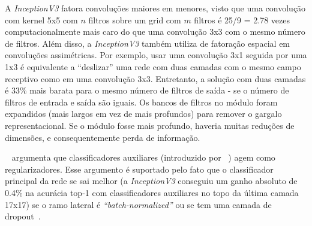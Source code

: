 \documentclass{bmvc2k}
\begin{document}
A \textit{InceptionV3} fatora convoluções maiores em menores, visto que uma convolução com kernel 5x5 com $n$ filtros sobre um grid com $m$ filtros é 25/9 = 2.78 vezes computacionalmente mais caro do que uma convolução 3x3 com o mesmo número de filtros. Além disso, a \textit{InceptionV3} também utiliza de fatoração espacial em convoluções assimétricas. Por exemplo, usar uma convolução 3x1 seguida por uma 1x3 é equivalente a ``deslizar'' uma rede com duas camadas com o mesmo campo receptivo como em uma convolução 3x3. Entretanto, a solução com duas camadas é 33\% mais barata para o mesmo número de filtros de saída - se o número de filtros de entrada e saída são iguais. Os bancos de filtros no módulo foram expandidos (mais largos em vez de mais profundos) para remover o gargalo representacional. Se o módulo fosse mais profundo, haveria muitas reduções de dimensões, e consequentemente perda de informação. 


~\cite{inception} argumenta que classificadores auxiliares (introduzido por ~\cite{going}) agem como regularizadores. Esse argumento é suportado pelo fato que o classificador principal da rede se sai melhor (a \textit{InceptionV3} conseguiu um ganho absoluto de 0.4\% na acurácia top-1 com classificadores auxiliares no topo da última camada 17x17) se o ramo lateral é \textit{``batch-normalized''} ou se tem uma camada de dropout~\cite{dropout}.
\end{document}

